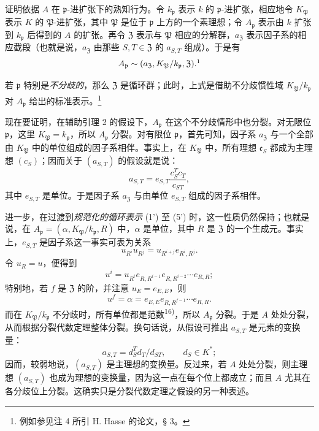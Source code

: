 \documentclass[11pt]{article}
\begin{document}
证明依据 \(A\) 在 \(\mathfrak p\)-进扩张下的熟知行为。令 \(k_{\mathfrak p}\) 表示 \(k\) 的 \(\mathfrak p\)-进扩张，相应地令 \(K_{\mathfrak P}\) 表示 \(K\) 的 \(\mathfrak P\)-进扩张，其中 \(\mathfrak P\) 是位于 \(\mathfrak p\) 上方的一个素理想；令 \(A_{\mathfrak p}\) 表示由 \(k\) 扩张到 \(k_{\mathfrak p}\) 后得到的 \(A\) 的扩张。再令 \(\mathfrak Z\) 表示与 \(\mathfrak P\) 相应的分解群，\(a_{\mathfrak Z}\) 表示因子系的相应截段（也就是说，\(a_{\mathfrak Z}\) 由那些 \(S,T\in\mathfrak Z\) 的 \(a_{S,T}\) 组成）。于是有
\[
A_{\mathfrak p}\sim(a_{\mathfrak Z},K_{\mathfrak P}/k_{\mathfrak p},\mathfrak Z).\footnotemark
\]

若 \(\mathfrak p\) 特别是\emph{不分歧的}，那么 \(\mathfrak Z\) 是循环群；此时，上式是借助不分歧惯性域 \(K_{\mathfrak P}/k_{\mathfrak p}\) 对 \(A_{\mathfrak p}\) 给出的标准表示。\footnote{例如参见注 4 所引 H. Hasse 的论文，§ 3。}

现在要证明，在辅助引理 2 的假设下，\(A_{\mathfrak p}\) 在这个不分歧情形中也分裂。对无限位 \(\mathfrak p\)，这里 \(K_{\mathfrak P}=k_{\mathfrak p}\)，所以 \(A_{\mathfrak p}\) 分裂。对有限位 \(\mathfrak p\)，首先可知，因子系 \(a_{\mathfrak Z}\) 与一个全部由 \(K_{\mathfrak P}\) 中的单位组成的因子系相伴。事实上，在 \(K_{\mathfrak P}\) 中，所有理想 \(\mathfrak c_S\) 都成为主理想 \((c_S)\)；因而关于 \((a_{S,T})\) 的假设就是说：
\[
a_{S,T}=e_{S,T}\frac{c_S^Tc_T}{c_{ST}},
\]
其中 \(e_{S,T}\) 是单位。于是因子系 \(a_{\mathfrak Z}\) 与由单位 \(e_{S,T}\) 组成的因子系相伴。

进一步，在过渡到\emph{规范化的循环表示} (1') 至 (5') 时，这一性质仍然保持；也就是说，在 \(A_{\mathfrak p}=(\alpha,K_{\mathfrak P}/k_{\mathfrak p},R)\) 中，\(\alpha\) 是单位，其中 \(R\) 是 \(\mathfrak Z\) 的一个生成元。事实上，\(e_{S,T}\) 是因子系这一事实可表为关系
\[
u_{R^i}u_{R^j}=u_{R^{i+j}}e_{R^i,R^j}.
\]
令 \(u_R=u\)，便得到
\[
u^i=u_{R^i}e_{R,R^{i-1}}e_{R,R^{i-2}}\cdots e_{R,R};
\]
特别地，若 \(f\) 是 \(\mathfrak Z\) 的阶，并注意 \(u_E=e_{E,E}\)，则
\[
u^f=\alpha=e_{E,E}e_{R,R^{f-1}}\cdots e_{R,R}.
\]
而在 \(K_{\mathfrak P}/k_{\mathfrak p}\) 不分歧时，所有单位都是范数\textsuperscript{16)}，所以 \(A_{\mathfrak p}\) 分裂。于是 \(A\) 处处分裂，从而根据分裂代数定理整体分裂。换句话说，从假设可推出 \(a_{S,T}\) 是元素的变换量：
\[
a_{S,T}=d_S^Td_T/d_{ST},\qquad d_S\in K^*;
\]
因而，较弱地说，\((a_{S,T})\) 是主理想的变换量。反过来，若 \(A\) 处处分裂，则主理想 \((a_{S,T})\) 也成为理想的变换量，因为这一点在每个位上都成立；而且 \(A\) 尤其在各分歧位上分裂。这确实只是分裂代数定理之假设的另一种表述。
\end{document}
